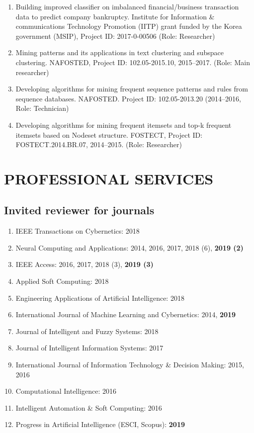 \documentclass[letterpaper]{article}
\begin{document}
\begin{enumerate}

\item Building improved classifier on imbalanced financial/business transaction data to predict company bankruptcy. Institute for Information \& communications Technology Promotion (IITP) grant funded by the Korea government (MSIP), Project ID: 2017-0-00506 (Role: Researcher) 

\item Mining patterns and its applications in text clustering and subspace clustering. NAFOSTED, Project ID: 102.05-2015.10, 2015--2017. (Role: Main researcher) 

\item Developing algorithms for mining frequent sequence patterns and rules from sequence databases. NAFOSTED. Project ID: 102.05-2013.20 (2014--2016, Role: Technician)

\item Developing algorithms for mining frequent itemsets and top-k frequent itemsets based on Nodeset structure. FOSTECT, Project ID: FOSTECT.2014.BR.07, 2014--2015. (Role: Researcher) 

\end{enumerate}

\section*{PROFESSIONAL SERVICES}

\subsection*{Invited reviewer for journals}

\begin{enumerate}

\item IEEE Transactions on Cybernetics: 2018
\item Neural Computing and Applications: 2014, 2016, 2017, 2018 (6), \textbf{2019 (2)}
\item IEEE Access: 2016, 2017, 2018 (3), \textbf{2019 (3)}
\item Applied Soft Computing: 2018
\item Engineering Applications of Artificial Intelligence: 2018
\item International Journal of Machine Learning and Cybernetics: 2014, \textbf{2019}
\item Journal of Intelligent and Fuzzy Systems: 2018
\item Journal of Intelligent Information Systems: 2017
\item International Journal of Information Technology \& Decision Making: 2015, 2016
\item Computational Intelligence: 2016
\item Intelligent Automation \& Soft Computing: 2016
\item Progress in Artificial Intelligence (ESCI, Scopus): \textbf{2019}

\end{enumerate}
\end{document}
